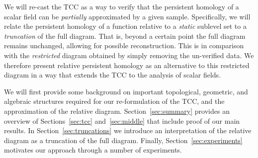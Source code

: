 We will re-cast the TCC as a way to verify that the persistent homology of a scalar field can be \emph{partially} approximated by a given sample. %
Specifically, we will relate the persistent homology of a function relative to a \emph{static} sublevel set to a \emph{truncation} of the full diagram.
That is, beyond a certain point the full diagram remains unchanged, allowing for possible reconstruction.
This is in comparison with the \emph{restricted} diagram obtained by simply removing the un-verified data.
We therefore present relative persistent homology as an alternative to this restricted diagram in a way that extends the TCC to the analysis of scalar fields.

We will first provide some background on important topological, geometric, and algebraic structures required for our re-formulation of the TCC, and the approximation of the relative diagram.
Section~\ref{sec:summary} provides an overview of Sections~\ref{sec:tcc} and~\ref{sec:middle} that include proof of our main results.
In Section~\ref{sec:truncations} we introduce an interpretation of the relative diagram as a truncation of the full diagram.%
Finally, Section~\ref{sec:experiments} motivates our approach through a number of experiments.

